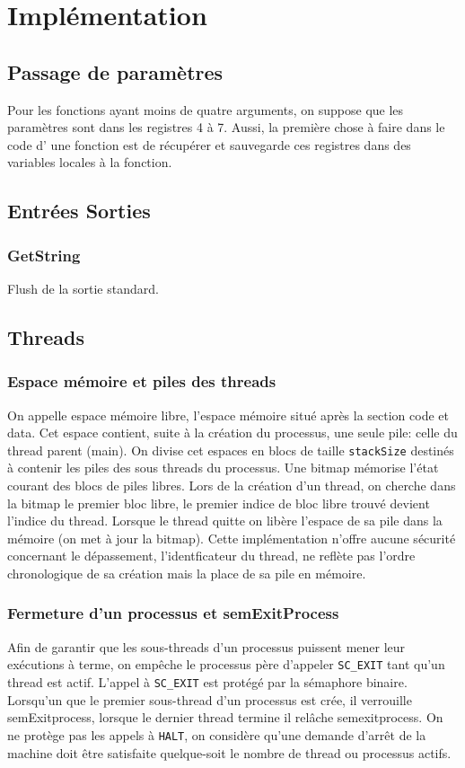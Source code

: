 \documentclass[11pt]{article}
\begin{document}
\section{Implémentation}
\subsection{Passage de paramètres}
Pour les fonctions ayant moins de quatre arguments, on suppose que les paramètres sont dans les registres 4 à 7.
Aussi, la première chose à faire dans le code d' une fonction est de récupérer et sauvegarde ces registres dans des variables
locales à la fonction.

\subsection{Entrées Sorties}
\subsubsection{GetString}
Flush de la sortie standard.

\subsection{Threads}
\subsubsection{Espace mémoire et piles des threads}
On appelle espace mémoire libre, l'espace mémoire situé après la section code et data.
Cet espace contient, suite à la création du processus, une seule pile: celle du thread parent (main).
On divise cet espaces en blocs de taille \texttt{stackSize} destinés à contenir les piles des sous threads du processus.
Une bitmap mémorise l'état courant des blocs de piles libres. Lors de la création d'un thread, on cherche dans la bitmap le
premier bloc libre, le premier indice de bloc libre trouvé devient l'indice du thread.
Lorsque le thread quitte on libère l'espace de sa pile dans la mémoire (on met à jour la bitmap).
Cette implémentation n'offre aucune sécurité concernant le dépassement, l'identficateur du thread, ne reflète pas l'ordre
chronologique de sa création mais la place de sa pile en mémoire.

\subsubsection{Fermeture d'un processus et semExitProcess}
Afin de garantir que les sous-threads d'un processus puissent mener leur exécutions à terme, on empêche
le processus père d'appeler \texttt{SC\_EXIT} tant qu'un thread est actif. L'appel à \texttt{SC\_EXIT} est protégé par la sémaphore binaire.
Lorsqu'un que le premier sous-thread d'un processus est crée, il verrouille semExitprocess, lorsque le dernier thread termine il relâche semexitprocess.
On ne protège pas les appels à \texttt{HALT}, on considère qu'une demande d'arrêt de la machine doit être satisfaite quelque-soit
le nombre de thread ou processus actifs.
\end{document}
